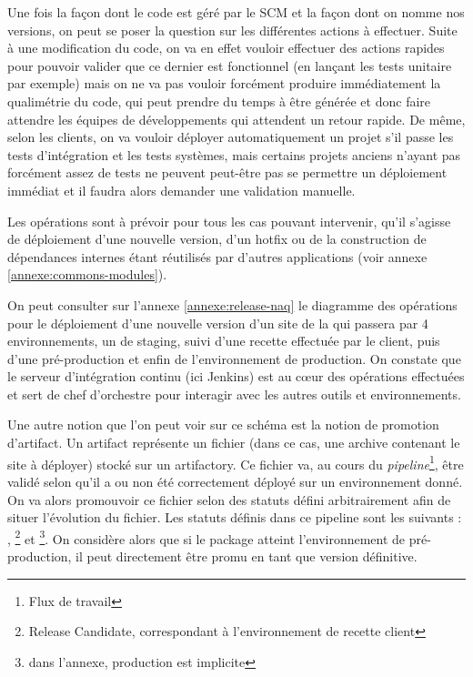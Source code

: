Une fois la façon dont le code est géré par le \gls{SCM} et la façon dont on nomme nos versions, on peut se poser la question sur les différentes actions à effectuer. Suite à une modification du code, on va en effet vouloir effectuer des actions rapides pour pouvoir valider que ce dernier est fonctionnel (en lançant les tests unitaire par exemple) mais on ne va pas vouloir forcément produire immédiatement la qualimétrie du code, qui peut prendre du temps à être générée et donc faire attendre les équipes de développements qui attendent un retour rapide. De même, selon les clients, on va vouloir déployer automatiquement un projet s'il passe les tests d'intégration et les tests systèmes, mais certains projets anciens n'ayant pas forcément assez de tests ne peuvent peut-être pas se permettre un déploiement immédiat et il faudra alors demander une validation manuelle.

Les opérations sont à prévoir pour tous les cas pouvant intervenir, qu'il s'agisse de déploiement d'une nouvelle version, d'un \gls{hotfix} ou de la construction de dépendances internes étant réutilisés par d'autres applications (voir annexe \ref{annexe:commons-modules}).

On peut consulter sur l'annexe \ref{annexe:release-naq} le diagramme des opérations pour le déploiement d'une nouvelle version d'un site de la \naq{} qui passera par 4 environnements, un de staging, suivi d'une recette effectuée par le client, puis d'une pré-production et enfin de l'environnement de production. On constate que le serveur d'intégration continu (ici Jenkins) est au cœur des opérations effectuées et sert de chef d'orchestre pour interagir avec les autres outils et environnements.

Une autre notion que l'on peut voir sur ce schéma est la notion de promotion d'artifact. Un artifact représente un fichier (dans ce cas, une archive contenant le site à déployer) stocké sur un \gls{artifactory}. Ce fichier va, au cours du \emph{pipeline}\footnote{Flux de travail}, être validé selon qu'il a ou non été correctement déployé sur un environnement donné. On va alors promouvoir ce fichier selon des statuts défini arbitrairement afin de situer l'évolution du fichier. Les statuts définis dans ce pipeline sont les suivants : , \footnote{Release Candidate, correspondant à l'environnement de recette client} et \footnote{dans l'annexe, production est implicite}. On considère alors que si le package atteint l'environnement de pré-production, il peut directement être promu en tant que version définitive.

